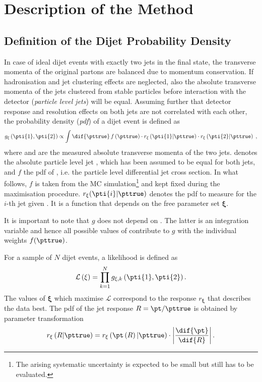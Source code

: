 

\section{Description of the Method}\label{sec:ResFit:Method}

\subsection{Definition of the Dijet Probability Density}
In case of ideal dijet events with exactly two jets in the final
state, the transverse momenta of the original partons are balanced due
to momentum conservation.
If hadronisation and jet clustering effects are neglected, also
the absolute transverse momenta of the jets clustered from stable
particles before interaction with the detector (\textit{particle level
  jets}) will be equal.
Assuming further that detector response and resolution effects on both jets are not correlated with each other, the probability density (\textit{pdf}) of a dijet event is defined as
\begin{equation}
  \label{eq:ResFit:DijetPdf}
  g_{\mathbf{\xi}}\left(\pti{1},\pti{2}\right) \propto \int\dif{\pttrue}\,f\left(\pttrue\right)
  \cdot r_{\mathbf{\xi}}\left(\pti{1}|\pttrue\right)
  \cdot r_{\mathbf{\xi}}\left(\pti{2}|\pttrue\right) \; ,
\end{equation}
where  and  are the measured absolute transverse momenta of
the two jets.
\pttrue denotes the absolute particle level jet \pt, which has been assumed to
be equal for both jets, and  $f$ the pdf of \pttrue, i.e. the particle level differential jet 
cross section.
In what follows, $f$ is taken from the MC
simulation\footnote{The arising systematic uncertainty is expected to
  be small but still has to be evaluated.}
and kept fixed during the maximisation procedure.
$r_{\mathbf{\xi}}(\pti{i}|\pttrue)$ denotes the pdf to measure  for the
$i$-th jet given \pttrue.
It is a function that depends on the free parameter set $\mathbf{\xi}$.

It is important to note that $g$ does not depend on \pttrue.
The latter is an integration variable and hence all possible values of \pttrue
contribute to $g$ with the individual weights $f(\pttrue)$.

For a sample of $N$ dijet events, a likelihood is defined as
\begin{equation}
  \label{eq:ResFit:Likelihood}
  \mathcal{L}\left(\mathbf{\xi}\right) = \prod^{N}_{k=1} g_{\mathbf{\xi},k}\left(\pti{1},\pti{2}\right).
\end{equation}
The values of $\mathbf{\xi}$ which maximise $\mathcal{L}$ correspond
to the response $r_{\mathbf{\xi}}$ that describes the data best.
The pdf of the jet \pt response \mbox{$R = \pt / \pttrue$} is obtained by parameter transformation
\begin{equation*}
  r_{\mathbf{\xi}}\left(R|\pttrue\right) =
  r_{\mathbf{\xi}}\left(\pt\left(R\right)|\pttrue\right)\cdot\left|\frac{\dif{\pt}}{\dif{R}}\right|.
\end{equation*}


